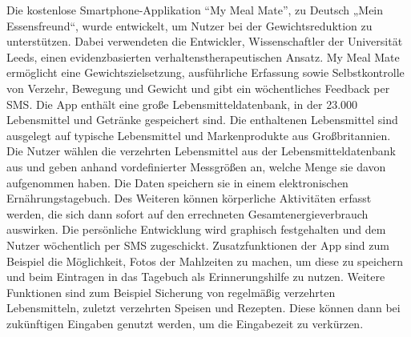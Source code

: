 Die kostenlose Smartphone-Applikation “My Meal Mate”, zu Deutsch  „Mein Essensfreund“, wurde entwickelt, um Nutzer bei der Gewichtsreduktion zu unterstützen. Dabei verwendeten die Entwickler, Wissenschaftler der Universität Leeds, einen evidenzbasierten verhaltenstherapeutischen Ansatz. My Meal Mate ermöglicht eine Gewichtszielsetzung, ausführliche Erfassung sowie Selbstkontrolle von Verzehr, Bewegung und Gewicht und gibt ein wöchentliches Feedback per SMS. Die App enthält eine große Lebensmitteldatenbank, in der 23.000 Lebensmittel und Getränke gespeichert sind. Die enthaltenen Lebensmittel sind ausgelegt auf typische Lebensmittel und Markenprodukte aus Großbritannien. Die Nutzer wählen die verzehrten Lebensmittel aus der Lebensmitteldatenbank aus und geben anhand vordefinierter Messgrößen an, welche Menge sie davon aufgenommen haben. Die Daten speichern sie in einem elektronischen Ernährungstagebuch. Des Weiteren können körperliche Aktivitäten erfasst werden, die sich dann sofort auf den errechneten Gesamtenergieverbrauch auswirken. Die persönliche Entwicklung wird graphisch festgehalten und dem Nutzer wöchentlich per SMS zugeschickt. Zusatzfunktionen der App sind zum Beispiel die Möglichkeit, Fotos der  Mahlzeiten zu machen, um diese zu speichern und beim Eintragen in das Tagebuch als Erinnerungshilfe zu nutzen. Weitere Funktionen sind zum Beispiel Sicherung von regelmäßig verzehrten Lebensmitteln, zuletzt verzehrten Speisen und Rezepten. Diese können dann bei zukünftigen Eingaben genutzt werden, um die Eingabezeit zu verkürzen. 


